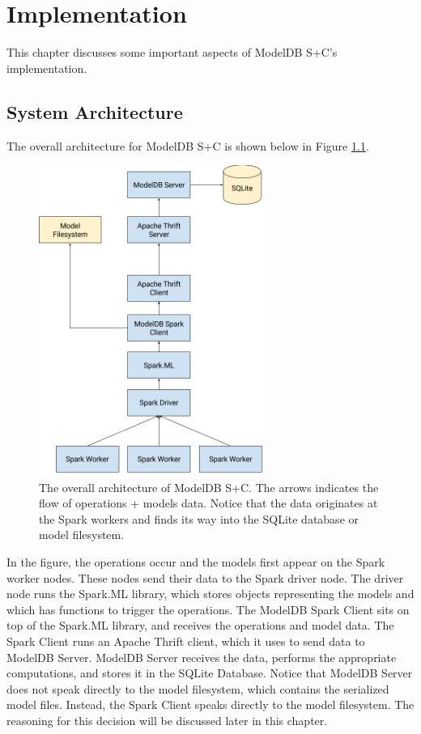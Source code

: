 \chapter{Implementation}
This chapter discusses some important aspects of ModelDB S+C's implementation.

\section{System Architecture}
The overall architecture for ModelDB S+C is shown below in Figure 
\ref{fig:system_architecture}.

\begin{figure}
  \centering
  \includegraphics[height=4.0in]{system_architecture}
  \caption{
    The overall architecture of ModelDB S+C. The arrows indicates the flow
    of operations + models data. Notice that the data originates at the Spark workers and
    finds its way into the SQLite database or model filesystem.
  }
  \label{fig:system_architecture}
\end{figure}

In the figure, the operations occur and the models first appear on the Spark worker nodes.
These nodes send their data to the Spark driver node. The driver node runs the Spark.ML
library, which stores objects representing the models and which has functions to trigger
the operations. The ModelDB Spark Client sits on top of the Spark.ML library, and receives the
operations and model data. The Spark Client runs an Apache Thrift client, which it uses to
send data to ModelDB Server. ModelDB Server receives the data, performs the appropriate computations,
and stores it in the SQLite Database. Notice that ModelDB Server does not speak directly to the
model filesystem, which contains the serialized model files. Instead, the Spark Client speaks directly
to the model filesystem. The reasoning for this decision will be discussed later in this chapter.

